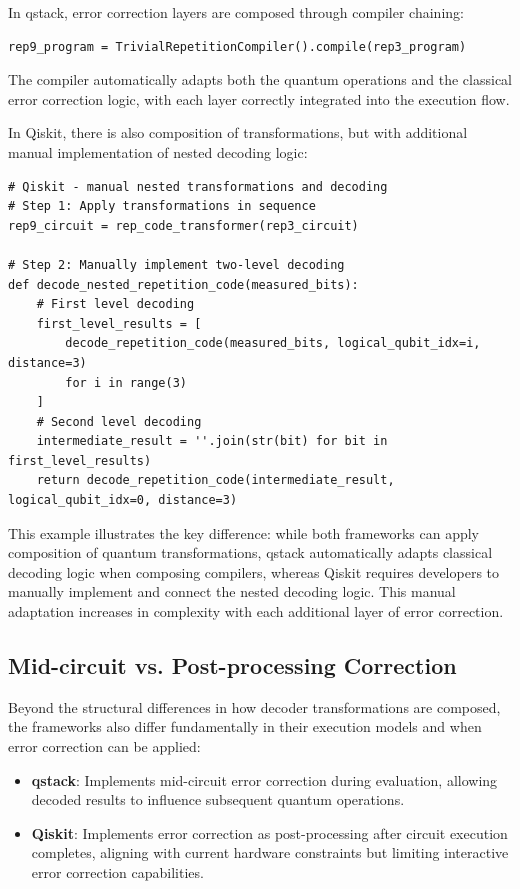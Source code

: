 In qstack, error correction layers are composed through compiler chaining:

\begin{verbatim}
rep9_program = TrivialRepetitionCompiler().compile(rep3_program)
\end{verbatim}

The compiler automatically adapts both the quantum operations and the classical error correction logic, with each layer correctly integrated into the execution flow.

In Qiskit, there is also composition of transformations, but with additional manual implementation of nested decoding logic:

\begin{verbatim}
# Qiskit - manual nested transformations and decoding
# Step 1: Apply transformations in sequence
rep9_circuit = rep_code_transformer(rep3_circuit)

# Step 2: Manually implement two-level decoding
def decode_nested_repetition_code(measured_bits):
    # First level decoding
    first_level_results = [
        decode_repetition_code(measured_bits, logical_qubit_idx=i, distance=3)
        for i in range(3)
    ]
    # Second level decoding
    intermediate_result = ''.join(str(bit) for bit in first_level_results)
    return decode_repetition_code(intermediate_result, logical_qubit_idx=0, distance=3)
\end{verbatim}

This example illustrates the key difference: while both frameworks can apply composition of quantum transformations, qstack automatically adapts classical decoding logic when composing compilers, whereas Qiskit requires developers to manually implement and connect the nested decoding logic. This manual adaptation increases in complexity with each additional layer of error correction.

\subsection{Mid-circuit vs. Post-processing Correction}

Beyond the structural differences in how decoder transformations are composed, the frameworks also differ fundamentally in their execution models and when error correction can be applied:

\begin{itemize}
\item \textbf{qstack}: Implements mid-circuit error correction during evaluation, allowing decoded results to influence subsequent quantum operations.

\item \textbf{Qiskit}: Implements error correction as post-processing after circuit execution completes, aligning with current hardware constraints but limiting interactive error correction capabilities.
\end{itemize}

